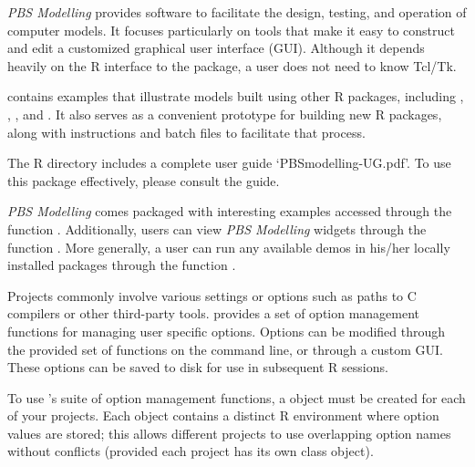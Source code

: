 \documentclass[letterpaper]{book}
\begin{document}
\begin{Description}\relax
\emph{PBS Modelling} provides software to facilitate the design, 
testing, and operation of computer models. It focuses particularly on 
tools that make it easy to construct and edit a customized graphical 
user interface (GUI). Although it depends heavily on the R interface 
to the  package, a user does not need to know Tcl/Tk. 

 contains examples that illustrate models built using 
other R packages, including , , 
, and . 
It also serves as a convenient prototype for building new R packages, 
along with instructions and batch files to facilitate that process.

The R directory  includes a complete 
user guide `PBSmodelling-UG.pdf'. To use this package effectively, 
please consult the guide.

\emph{PBS Modelling} comes packaged with interesting examples accessed 
through the function .
Additionally, users can view \emph{PBS Modelling} widgets through the 
function . 
More generally, a user can run any available demos in his/her locally 
installed packages through the function .
\end{Description}
%
\begin{Description}\relax
Projects commonly involve various settings or options such as paths to C compilers or other third-party tools.
 provides a set of option management functions for managing user specific options. Options can be 
modified through the provided set of functions on the command line, or through a custom GUI.
These options can be saved to disk for use in subsequent R sessions.

To use 's suite of option management functions, a  object must be
created for each of your projects. Each  object contains a distinct R environment where 
option values are stored; this allows different projects to use overlapping option names without conflicts
(provided each project has its own  class object).

\end{Description}
\end{document}
